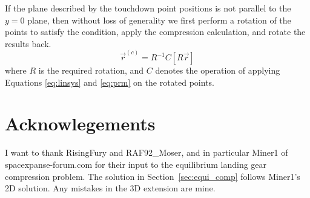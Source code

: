 \documentclass{article}
\begin{document}
If the plane described by the touchdown point positions is not parallel to the $y=0$ plane, then without loss of generality we first perform a rotation of the points to satisfy the condition, apply the compression calculation, and rotate the results back.
\begin{equation}
\vec{r}^{(c)} = R^{-1} C [R \vec{r}]
\end{equation}
where $R$ is the required rotation, and $C$ denotes the operation of applying Equations \ref{eq:linsys} and \ref{eq:prm} on the rotated points.

\section{Acknowlegements}
I want to thank RisingFury and RAF92\_Moser, and in particular Miner1 of spacexpanse-forum.com for their input to the equilibrium landing gear compression problem. The solution in Section~\ref{sec:equi_comp} follows Miner1's 2D solution. Any mistakes in the 3D extension are mine.


\end{document}
